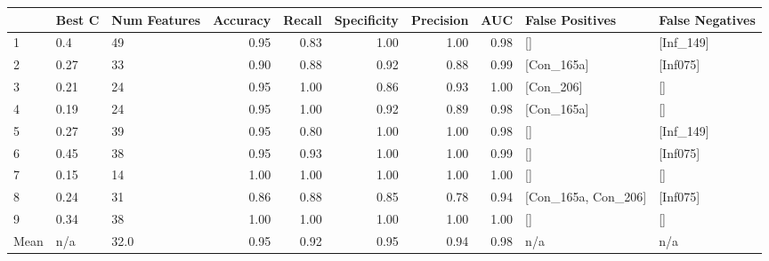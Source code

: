 \begin{tabular}{lllrrrrrll}
\toprule
{} & Best C & Num Features &  Accuracy &  Recall &  Specificity &  Precision &   AUC &      False Positives & False Negatives \\
\midrule
1    &    0.4 &           49 &      0.95 &    0.83 &         1.00 &       1.00 &  0.98 &                   [] &       [Inf\_149] \\
2    &   0.27 &           33 &      0.90 &    0.88 &         0.92 &       0.88 &  0.99 &           [Con\_165a] &        [Inf075] \\
3    &   0.21 &           24 &      0.95 &    1.00 &         0.86 &       0.93 &  1.00 &            [Con\_206] &              [] \\
4    &   0.19 &           24 &      0.95 &    1.00 &         0.92 &       0.89 &  0.98 &           [Con\_165a] &              [] \\
5    &   0.27 &           39 &      0.95 &    0.80 &         1.00 &       1.00 &  0.98 &                   [] &       [Inf\_149] \\
6    &   0.45 &           38 &      0.95 &    0.93 &         1.00 &       1.00 &  0.99 &                   [] &        [Inf075] \\
7    &   0.15 &           14 &      1.00 &    1.00 &         1.00 &       1.00 &  1.00 &                   [] &              [] \\
8    &   0.24 &           31 &      0.86 &    0.88 &         0.85 &       0.78 &  0.94 &  [Con\_165a, Con\_206] &        [Inf075] \\
9    &   0.34 &           38 &      1.00 &    1.00 &         1.00 &       1.00 &  1.00 &                   [] &              [] \\
Mean &    n/a &         32.0 &      0.95 &    0.92 &         0.95 &       0.94 &  0.98 &                  n/a &             n/a \\
\bottomrule
\end{tabular}
